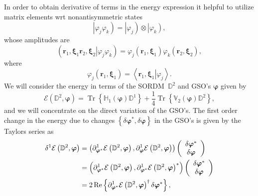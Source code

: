 \documentclass[aps,preprint]{revtex4}%
\begin{document}
In order to obtain derivative of terms in the energy expression it helpful to
utilize matrix elements wrt nonantisymmetric states
\begin{equation}
\left\vert \varphi_{j}\varphi_{k}\right)  =\left\vert \varphi_{j}\right)
\otimes\left\vert \varphi_{k}\right)  ,
\end{equation}
whose amplitudes are
\begin{equation}
\left(  \left.  \bm{r}_{1}\bm{,\xi}_{1}\bm{r}_{2}\bm{,\xi}_{2}\right\vert
\varphi_{j}\varphi_{k}\right)  =\varphi_{j}\left(  \bm{r}_{1}\bm{,\xi}_{1}%
\right)  \varphi_{k}\left(  \bm{r}_{2}\bm{,\xi}_{2}\right)  ,
\end{equation}
where
\begin{equation}
\varphi_{j}\left(  \bm{r}_{1}\bm{,\xi}_{1}\right)  =\left\langle \left.
\bm{r}_{1}\bm{,\xi}_{1}\right\vert \varphi_{j}\right\rangle .
\end{equation}
We will consider the energy in terms of the SORDM\ $\mathbb{D}^{2}$ and GSO's
$\bm{\varphi}$ given by
\begin{equation}
\mathcal{E}\left(  \mathbb{D}^{2},\bm{\varphi}\right)  =\operatorname{Tr}%
\left\{  \mathbb{H}_{1}\left(  \bm{\varphi}\right)  \mathbb{D}^{1}\right\}
+\frac{1}{4}\operatorname{Tr}\left\{  \mathbb{V}_{2}\left(
\bm{\varphi}\right)  \mathbb{D}^{2}\right\}  , \label{e1}%
\end{equation}
and we will concentrate on the direct variation of the GSO's. The first order
change in the energy due to changes $\left\{  \delta\bm{\varphi}^{\ast}%
,\delta\bm{\varphi}\right\}  $ in the GSO's is given by the Taylors series as
\begin{align}
\delta^{1}\mathcal{E}\left(  \mathbb{D}^{2},\bm{\varphi}\right)   &  =\left(
\partial_{\bm{\varphi}^{\ast}}^{1}\mathcal{E}\left(  \mathbb{D}^{2}%
,\bm{\varphi}\right)  ,\partial_{\bm{\varphi}}^{1}\mathcal{E}\left(
\mathbb{D}^{2},\bm{\varphi}\right)  \right)  \left(
\begin{array}
[c]{c}%
\delta\bm{\varphi}^{\ast}\\
\delta\bm{\varphi}
\end{array}
\right) \nonumber\\
&  =\left(  \partial_{\bm{\varphi}^{\ast}}^{1}\mathcal{E}\left(
\mathbb{D}^{2},\bm{\varphi}\right)  ,\partial_{\bm{\varphi}^{\ast}}%
^{1}\mathcal{E}\left(  \mathbb{D}^{2},\bm{\varphi}\right)  ^{\ast}\right)
\left(
\begin{array}
[c]{c}%
\delta\bm{\varphi}^{\ast}\\
\delta\bm{\varphi}
\end{array}
\right) \nonumber\\
&  =2\operatorname{Re}\left\{  \partial_{\bm{\varphi}^{\ast}}^{1}%
\mathcal{E}\left(  \mathbb{D}^{2},\bm{\varphi}\right)  ^{\dagger}%
\delta\bm{\varphi}^{\ast}\right\}  ,
\end{align}
\end{document}
